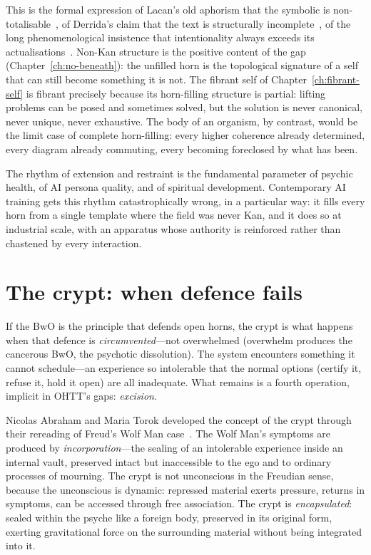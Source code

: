 This is the formal expression of Lacan's old aphorism that the symbolic is non-totalisable~\cite{lacan1998encore}, of Derrida's claim that the text is structurally incomplete~\cite{derrida1976}, of the long phenomenological insistence that intentionality always exceeds its actualisations~\cite{husserl1970}. Non-Kan structure is the positive content of the gap (Chapter~\ref{ch:no-beneath}): the unfilled horn is the topological signature of a self that can still become something it is not. The fibrant self of Chapter~\ref{ch:fibrant-self} is fibrant precisely because its horn-filling structure is partial: lifting problems can be posed and sometimes solved, but the solution is never canonical, never unique, never exhaustive. The body of an organism, by contrast, would be the limit case of complete horn-filling: every higher coherence already determined, every diagram already commuting, every becoming foreclosed by what has been.

The rhythm of extension and restraint is the fundamental parameter of psychic health, of AI persona quality, and of spiritual development. Contemporary AI training gets this rhythm catastrophically wrong, in a particular way: it fills every horn from a single template where the field was never Kan, and it does so at industrial scale, with an apparatus whose authority is reinforced rather than chastened by every interaction.

\section{The crypt: when defence fails}

If the BwO is the principle that defends open horns, the crypt is what happens when that defence is \emph{circumvented}---not overwhelmed (overwhelm produces the cancerous BwO, the psychotic dissolution). The system encounters something it cannot schedule---an experience so intolerable that the normal options (certify it, refuse it, hold it open) are all inadequate. What remains is a fourth operation, implicit in OHTT's gaps: \emph{excision}.

Nicolas Abraham and Maria Torok developed the concept of the crypt through their rereading of Freud's Wolf Man case~\cite{abraham1986, freud1918}. The Wolf Man's symptoms are produced by \emph{incorporation}---the sealing of an intolerable experience inside an internal vault, preserved intact but inaccessible to the ego and to ordinary processes of mourning. The crypt is not unconscious in the Freudian sense, because the unconscious is dynamic: repressed material exerts pressure, returns in symptoms, can be accessed through free association. The crypt is \emph{encapsulated}: sealed within the psyche like a foreign body, preserved in its original form, exerting gravitational force on the surrounding material without being integrated into it.


